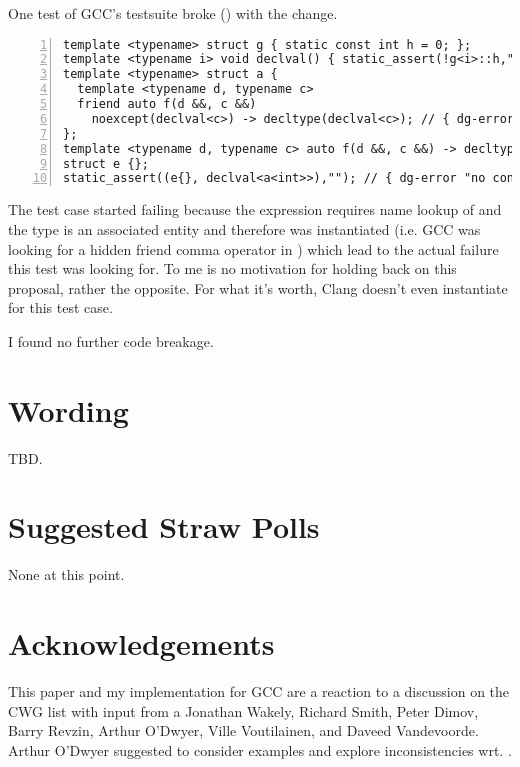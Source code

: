 One test of GCC's testsuite broke () with the change.
\begin{lstlisting}[style=Vc,numbers=left,float={hbtp},label=lst:noexcept41,caption={
GCC test that broke after implementation of less eager ADL (\code{declval<a<int>>} without 
parenthesis is no error --- with parenthesis \code{a<int>} isn't an associated entity)}]
template <typename> struct g { static const int h = 0; };
template <typename i> void declval() { static_assert(!g<i>::h,""); }
template <typename> struct a {
  template <typename d, typename c>
  friend auto f(d &&, c &&)
    noexcept(declval<c>) -> decltype(declval<c>); // { dg-error "different exception" }
};
template <typename d, typename c> auto f(d &&, c &&) -> decltype(declval<c>);
struct e {};
static_assert((e{}, declval<a<int>>),""); // { dg-error "no context to resolve type" }
\end{lstlisting}
The test case started failing because the expression  
requires name lookup of  and the type  is an associated 
entity and therefore was instantiated (i.e. GCC was looking for a hidden friend comma 
operator in ) which lead to the actual failure this test was looking for. To 
me  is no motivation for holding back on this proposal, rather the 
opposite. For what it's worth, Clang doesn't even instantiate  for this test 
case.

I found no further code breakage.

\section{Wording}
TBD.

\section{Suggested Straw Polls}
None at this point.

\section{Acknowledgements}
This paper and my implementation for GCC are a reaction to a discussion on the CWG list 
with input from a Jonathan Wakely, Richard Smith, Peter Dimov, Barry Revzin, Arthur 
O'Dwyer, Ville Voutilainen, and Daveed Vandevoorde.
Arthur O'Dwyer suggested to consider  examples and explore 
inconsistencies wrt. .


